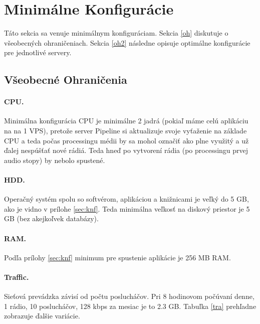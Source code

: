 \documentclass[11pt]{article}
\begin{document}
\section{Minimálne Konfigurácie \label{min}}

Táto sekcia sa venuje minimálnym konfiguráciam. Sekcia \ref{oh} diskutuje o všeobecných ohraničeniach. Sekcia \ref{oh2} následne opisuje optimálne konfigurácie pre jednotlivé servery.



\subsection{Všeobecné Ohraničenia \label{oh}}

\paragraph{CPU.} Minimálna konfigurácia CPU je minimálne 2 jadrá (pokiaľ máme celú aplikáciu na na 1 VPS), pretože server Pipeline si aktualizuje svoje vyťaženie na základe CPU a teda počas processingu médii by sa mohol označiť ako plne využitý a už ďalej nespúšťať nové rádiá. Teda hneď po vytvorení rádia (po processingu prvej audio stopy) by nebolo spustené. 

\paragraph{HDD.} Operačný systém spolu so softvérom, aplikáciou a knižnicami je veľký do 5 GB, ako je vidno v prílohe \ref{sec:knf}. Teda minimálna veľkosť na diskový priestor je 5 GB (bez akejkoľvek databázy).

\paragraph{RAM.} Podľa prílohy \ref{sec:knf} minimum pre spustenie aplikácie je 256 MB RAM.

\paragraph{Traffic.} Sieťová prevádzka závisí od počtu poslucháčov. Pri 8 hodinovom počúvaní denne, 1 rádio, 10 poslucháčov, 128 kbps za mesiac je to 2.3 GB. Tabuľka \ref{tra} prehľadne zobrazuje ďalšie variácie.
\end{document}
